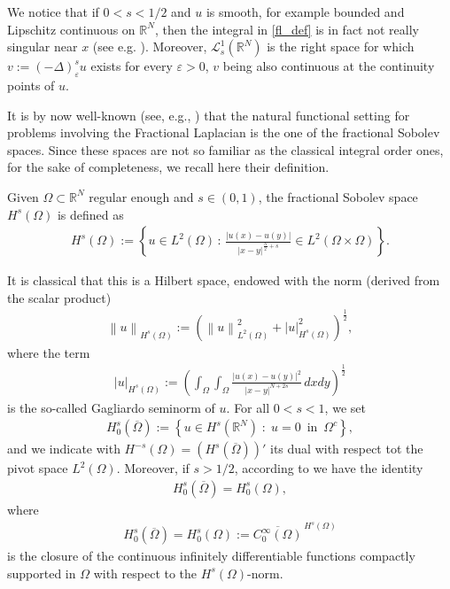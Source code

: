 \documentclass[reqno,twoside]{amsart}
\numberwithin{equation}{section}
\def\RR{{\mathbb{R}}}
\newcommand{\norm}[2]{{\left\|#1\right\|}_{#2}}
\newcommand{\rouge}[1]{{\color{red}#1}}
\begin{document}
We notice that if $0<s<1/2$ and $u$ is smooth, for example bounded and Lipschitz continuous on $\RR^N$, then the integral in \eqref{fl_def} is in fact not really singular near $x$ (see e.g. \cite[Remark 3.1]{dihitchhiker}). Moreover, $\mathcal L_s^{1}(\RR^N)$ is the right space for which $ v:=(-\Delta)_\varepsilon^s u$ exists for every $\varepsilon>0$, $v$ being also continuous at the continuity points of  $u$. 

It is by now well-known (see, e.g., \cite{dihitchhiker}) that the natural functional setting for problems involving the Fractional Laplacian is the one of the fractional Sobolev spaces. Since these spaces are not so familiar as the classical integral order ones, for the sake of completeness, we recall here their definition. 

Given $\Omega\subset\RR^N$ regular enough and $s\in(0,1)$, the fractional Sobolev space $H^s({\Omega})$ is defined as
\begin{align*}
	H^s(\Omega):= \left\{u\in L^2(\Omega)\,:\, \frac{|u(x)-u(y)|}{|x-y|^{\frac N2+s}}\in L^2(\Omega\times\Omega)\right\}.
\end{align*}

It is classical that this is a Hilbert space, endowed with the norm (derived from the scalar product)
\begin{align*}
	\norm{u}{H^s(\Omega)} := \left(\norm{u}{L^2(\Omega)}^2 + |u|_{H^s(\Omega)}^2\right)^{\frac 12},
\end{align*}
where the term 
\begin{align*}
	|u|_{H^s(\Omega)}:= \left(\int_\Omega\int_\Omega \frac{|u(x)-u(y)|^2}{|x-y|^{N+2s}}\,dxdy\right)^{\frac 12}
\end{align*}
is the so-called Gagliardo seminorm of $u$. \rouge{For all $0<s<1$, we set 
\begin{align*}
	H_0^s(\overline{\Omega}):= \left\{u\in H^s(\RR^N)\;:\;u=0\,\textrm{ in }\,\Omega^c\right\},
\end{align*}
and we indicate with $H^{-s}(\Omega)=\left(H^s(\overline{\Omega})\right)'$ its dual with respect tot the pivot space $L^2(\Omega)$. Moreover, if $s>1/2$, according to \cite[Theorem 6]{fiscella2015density} we have the identity
\begin{align*}
	H_0^s(\overline{\Omega})= H_0^s(\Omega),
\end{align*}
where 
\begin{align*}
	H_0^s(\overline{\Omega})= H_0^s(\Omega):= \overline{C_0^\infty(\Omega)}^{\,H^s(\Omega)}
\end{align*}
is the closure of the continuous infinitely differentiable functions compactly supported in $\Omega$ with respect to the $H^s(\Omega)$-norm.
}
\end{document}
